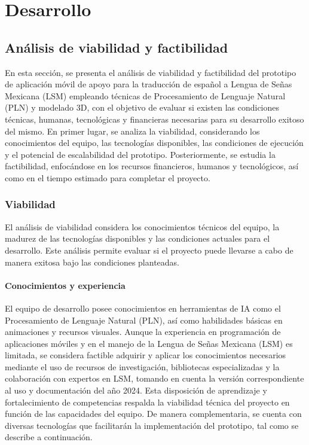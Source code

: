 \chapter{Desarrollo}
\section{Análisis de viabilidad y factibilidad}
En esta sección, se presenta el análisis de viabilidad y factibilidad del prototipo de aplicación móvil de apoyo para la traducción de español a Lengua de Señas Mexicana (LSM) empleando técnicas de Procesamiento de Lenguaje Natural (PLN) y modelado 3D, con el objetivo de evaluar si existen las condiciones técnicas, humanas, tecnológicas y financieras necesarias para su desarrollo exitoso del mismo. En primer lugar, se analiza la viabilidad, considerando los conocimientos del equipo, las tecnologías disponibles, las condiciones de ejecución y el potencial de escalabilidad del prototipo. Posteriormente, se estudia la factibilidad, enfocándose en los recursos financieros, humanos y tecnológicos, así como en el tiempo estimado para completar el proyecto.\\

\subsection{Viabilidad}
El análisis de viabilidad considera los conocimientos técnicos del equipo, la madurez de las tecnologías disponibles y las condiciones actuales para el desarrollo. Este análisis permite evaluar si el proyecto puede llevarse a cabo de manera exitosa bajo las condiciones planteadas.

\subsubsection{Conocimientos y experiencia}
El equipo de desarrollo posee conocimientos en herramientas de IA como el Procesamiento de Lenguaje Natural (PLN), así como habilidades básicas en animaciones y recursos visuales. Aunque la experiencia en programación de aplicaciones móviles y en el manejo de la Lengua de Señas Mexicana (LSM) es limitada, se considera factible adquirir y aplicar los conocimientos necesarios mediante el uso de recursos de investigación, bibliotecas especializadas y la colaboración con expertos en LSM, tomando en cuenta la versión correspondiente al uso y documentación del año 2024. Esta disposición de aprendizaje y fortalecimiento de competencias respalda la viabilidad técnica del proyecto en función de las capacidades del equipo.
De manera complementaria, se cuenta con diversas tecnologías que facilitarán la implementación del prototipo, tal como se describe a continuación.

